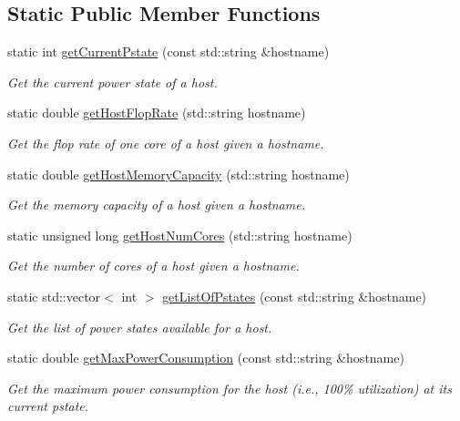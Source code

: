\subsection*{Static Public Member Functions}
\begin{DoxyCompactItemize}
\item 
static int \hyperlink{classwrench_1_1_simulation_a3d204b229feec1eee4f1e82d92490d81}{get\+Current\+Pstate} (const std\+::string \&hostname)
\begin{DoxyCompactList}\small\item\em Get the current power state of a host. \end{DoxyCompactList}\item 
static double \hyperlink{classwrench_1_1_simulation_a736b72b8fb5343f93d3a461f85f221ef}{get\+Host\+Flop\+Rate} (std\+::string hostname)
\begin{DoxyCompactList}\small\item\em Get the flop rate of one core of a host given a hostname. \end{DoxyCompactList}\item 
static double \hyperlink{classwrench_1_1_simulation_a757dde71d164a89ff52e49c4c52af0b5}{get\+Host\+Memory\+Capacity} (std\+::string hostname)
\begin{DoxyCompactList}\small\item\em Get the memory capacity of a host given a hostname. \end{DoxyCompactList}\item 
static unsigned long \hyperlink{classwrench_1_1_simulation_a6f0f556690d10d683a61acc3f10f5521}{get\+Host\+Num\+Cores} (std\+::string hostname)
\begin{DoxyCompactList}\small\item\em Get the number of cores of a host given a hostname. \end{DoxyCompactList}\item 
static std\+::vector$<$ int $>$ \hyperlink{classwrench_1_1_simulation_abb75fd040236995186d9ad45434fe069}{get\+List\+Of\+Pstates} (const std\+::string \&hostname)
\begin{DoxyCompactList}\small\item\em Get the list of power states available for a host. \end{DoxyCompactList}\item 
static double \hyperlink{classwrench_1_1_simulation_ae76b92ce868c6e6c1683377d869a5b34}{get\+Max\+Power\+Consumption} (const std\+::string \&hostname)
\begin{DoxyCompactList}\small\item\em Get the maximum power consumption for the host (i.\+e., 100\% utilization) at its current pstate. \end{DoxyCompactList}\item 

\end{DoxyCompactItemize}
